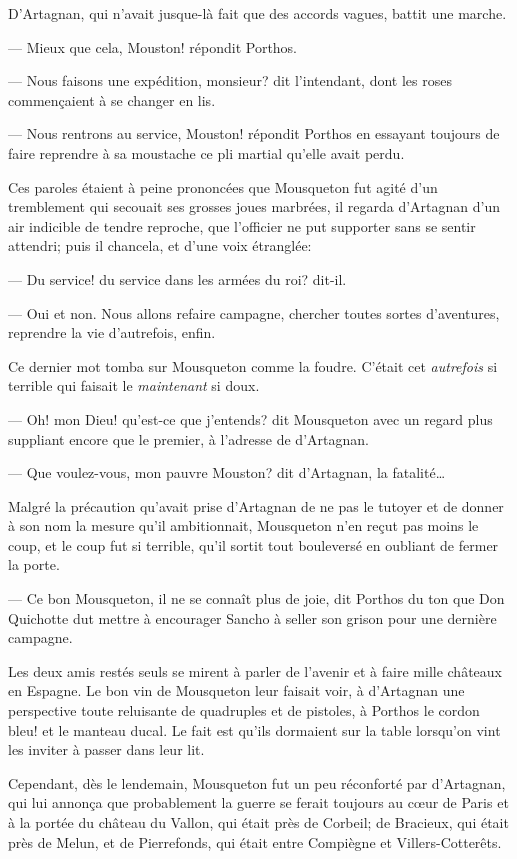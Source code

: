 D'Artagnan, qui n'avait jusque-là fait que des accords vagues, battit une marche.

— Mieux que cela, Mouston! répondit Porthos.

— Nous faisons une expédition, monsieur? dit l'intendant, dont les roses commençaient à se changer en lis.

— Nous rentrons au service, Mouston! répondit Porthos en essayant toujours de faire reprendre à sa moustache ce pli martial qu'elle avait perdu.

Ces paroles étaient à peine prononcées que Mousqueton fut agité d'un tremblement qui secouait ses grosses joues marbrées, il regarda d'Artagnan d'un air indicible de tendre reproche, que l'officier ne put supporter sans se sentir attendri; puis il chancela, et d'une voix étranglée:

— Du service! du service dans les armées du roi? dit-il.

— Oui et non. Nous allons refaire campagne, chercher toutes sortes d'aventures, reprendre la vie d'autrefois, enfin.

Ce dernier mot tomba sur Mousqueton comme la foudre. C'était cet \textit{autrefois} si terrible qui faisait le \textit{maintenant} si doux.

— Oh! mon Dieu! qu'est-ce que j'entends? dit Mousqueton avec un regard plus suppliant encore que le premier, à l'adresse de d'Artagnan.

— Que voulez-vous, mon pauvre Mouston? dit d'Artagnan, la fatalité\dots

Malgré la précaution qu'avait prise d'Artagnan de ne pas le tutoyer et de donner à son nom la mesure qu'il ambitionnait, Mousqueton n'en reçut pas moins le coup, et le coup fut si terrible, qu'il sortit tout bouleversé en oubliant de fermer la porte.

— Ce bon Mousqueton, il ne se connaît plus de joie, dit Porthos du ton que Don Quichotte dut mettre à encourager Sancho à seller son grison pour une dernière campagne.

Les deux amis restés seuls se mirent à parler de l'avenir et à faire mille châteaux en Espagne. Le bon vin de Mousqueton leur faisait voir, à d'Artagnan une perspective toute reluisante de quadruples et de pistoles, à Porthos le cordon bleu! et le manteau ducal. Le fait est qu'ils dormaient sur la table lorsqu'on vint les inviter à passer dans leur lit.

Cependant, dès le lendemain, Mousqueton fut un peu réconforté par d'Artagnan, qui lui annonça que probablement la guerre se ferait toujours au cœur de Paris et à la portée du château du Vallon, qui était près de Corbeil; de Bracieux, qui était près de Melun, et de Pierrefonds, qui était entre Compiègne et Villers-Cotterêts.

